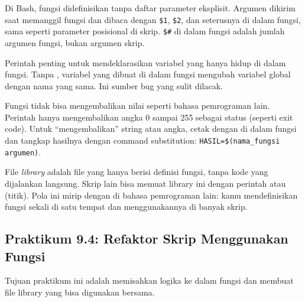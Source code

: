 Di Bash, fungsi didefinisikan tanpa daftar parameter eksplisit. Argumen
dikirim saat memanggil fungsi dan dibaca dengan \texttt{\$1},
\texttt{\$2}, dan seterusnya di dalam fungsi, sama seperti parameter
posisional di skrip. \texttt{\$\#} di dalam fungsi adalah jumlah argumen
fungsi, bukan argumen skrip.

Perintah  penting untuk mendeklarasikan variabel yang hanya
hidup di dalam fungsi. Tanpa , variabel yang dibuat di dalam
fungsi mengubah variabel global dengan nama yang sama. Ini sumber bug
yang sulit dilacak.

Fungsi tidak bisa mengembalikan nilai seperti bahasa pemrograman lain.
Perintah  hanya mengembalikan angka 0 sampai 255 sebagai
status (seperti exit code). Untuk ``mengembalikan'' string atau angka,
cetak dengan  di dalam fungsi dan tangkap hasilnya dengan
command substitution: \texttt{HASIL=\$(nama\_fungsi argumen)}.

File \textit{library} adalah file yang hanya berisi definisi fungsi,
tanpa kode yang dijalankan langsung. Skrip lain bisa memuat library ini
dengan perintah  atau  (titik). Pola ini mirip dengan
 di bahasa pemrograman lain: kamu mendefinisikan fungsi sekali
di satu tempat dan menggunakannya di banyak skrip.

\subsection*{Praktikum 9.4: Refaktor Skrip Menggunakan Fungsi}

Tujuan praktikum ini adalah memisahkan logika ke dalam fungsi dan
membuat file library yang bisa digunakan bersama.

